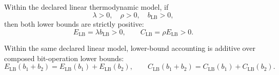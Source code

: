 \begin{proposition}\label{prop:thermo-mandatory-cost}
Within the declared linear thermodynamic model, if
\[
\lambda > 0,\quad \rho > 0,\quad b_{\mathrm{LB}} > 0,
\]
then both lower bounds are strictly positive:
\[
E_{\mathrm{LB}}=\lambda b_{\mathrm{LB}} > 0,\qquad
C_{\mathrm{LB}}=\rho E_{\mathrm{LB}} > 0.
\]
\end{proposition}

\begin{proposition}\label{prop:thermo-conservation-additive}
Within the same declared linear model, lower-bound accounting is additive over composed bit-operation lower bounds:
\[
E_{\mathrm{LB}}(b_1+b_2)=E_{\mathrm{LB}}(b_1)+E_{\mathrm{LB}}(b_2),\qquad
C_{\mathrm{LB}}(b_1+b_2)=C_{\mathrm{LB}}(b_1)+C_{\mathrm{LB}}(b_2).
\]
\end{proposition}
